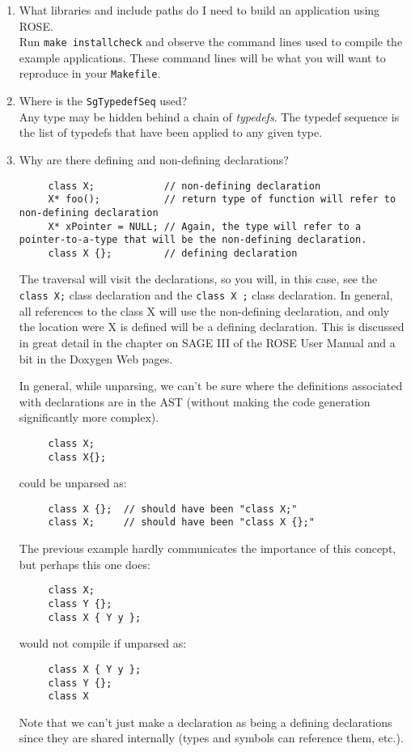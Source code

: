 \begin{enumerate}
\item What libraries and include paths do I need to build an application using ROSE. \\
      Run {\tt make installcheck} and observe the command lines used to
      compile the example applications.  These command lines will be what you will
      want to reproduce in your {\tt Makefile}.

\item Where is the {\tt SgTypedefSeq} used? \\
    Any type may be hidden behind a chain of {\em typedefs}. The typedef sequence is the
    list of typedefs that have been applied to any given type.

\item Why are there defining and non-defining declarations? \\

{\indent
{\mySmallFontSize
\begin{verbatim}
     class X;            // non-defining declaration
     X* foo();           // return type of function will refer to non-defining declaration
     X* xPointer = NULL; // Again, the type will refer to a pointer-to-a-type that will be the non-defining declaration.
     class X {};         // defining declaration
\end{verbatim}
}}

The traversal will visit the declarations, so you will, in this case, see the {\tt class X;}
class declaration and the {\tt class X {};} class declaration.  In general, all references to
the class X will use the non-defining declaration, and only the location were X is defined
will be a defining declaration.  This is discussed in great detail in the chapter on SAGE III of 
the ROSE User Manual and a bit in the Doxygen Web pages.

In general, while unparsing, we can't be sure where the definitions associated with
declarations are in the AST (without making the code generation significantly more
complex).
{\indent
{\mySmallFontSize
\begin{verbatim}
     class X;
     class X{};
\end{verbatim}
}}
could be unparsed as:
{\indent
{\mySmallFontSize
\begin{verbatim}
     class X {};  // should have been "class X;"
     class X;     // should have been "class X {};"
\end{verbatim}
}}
The previous example hardly communicates the importance of this concept, but perhaps this
one does:
{\indent
{\mySmallFontSize
\begin{verbatim}
     class X;
     class Y {};
     class X { Y y };
\end{verbatim}
}}
would not compile if unparsed as:
{\indent
{\mySmallFontSize
\begin{verbatim}
     class X { Y y };
     class Y {};
     class X
\end{verbatim}
}}
Note that we can't just make a declaration as being a defining declarations since they are
shared internally (types and symbols can reference them, etc.).




\end{enumerate}
